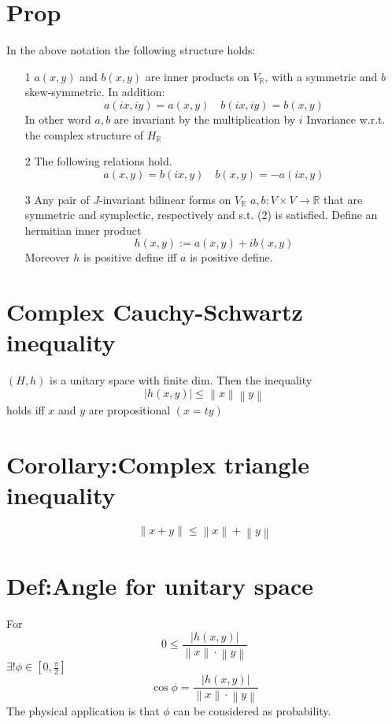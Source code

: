 \documentclass{book}
\newcommand{\abs}[1]{\left\lvert #1 \right\rvert}
\newcommand{\norm}[1]{\left\lVert #1 \right\rVert}
\begin{document}
\section{Prop}
In the above notation the following structure holds:
\begin{itemize}
    \item [1] $a(x,y)$ and $b(x,y)$ are inner products on $V_\mathbb{R}$, with a symmetric and $b$ skew-symmetric. In addition:$$a(ix,iy)=a(x,y)\quad b(ix,iy)=b(x,y)$$In other word $a,b$ are invariant by the multiplication by $i$ Invariance w.r.t. the complex structure of $H_\mathbb{R}$
    \item [2]The following relations hold. $$a(x,y)=b(ix,y)\quad b(x,y)=-a(ix,y)$$
    \item [3]Any pair of $J$-invariant bilinear forms on $V_\mathbb{R}$ $a,b:V\times V\rightarrow \mathbb{R}$ that are symmetric and symplectic, respectively and s.t. (2) is satisfied. Define an hermitian inner product$$h(x,y):=a(x,y)+ib(x,y)$$ Moreover $h$ is positive define iff $a$ is positive define.
\end{itemize}
\section{Complex Cauchy-Schwartz inequality}
$(H,h)$ is a unitary space with finite dim. Then the inequality$$\abs{h(x,y)}\leq\norm{x}\norm{y}$$holds iff $x$ and $y$ are propositional $(x=ty)$
\section{Corollary:Complex triangle inequality}$$\norm{x+y}\leq\norm{x}+\norm{y}$$
\section{Def:Angle for unitary space}
For $$0\leq\frac{\abs{h(x,y)}}{\norm{x}\cdot\norm{y}}$$
$\exists !\phi\in [0,\frac{\pi}{2}]$$$\cos\phi=\frac{\abs{h(x,y)}}{\norm{x}\cdot\norm{y}}$$
The physical application is that $\phi$ can be considered as probability.
\end{document}
